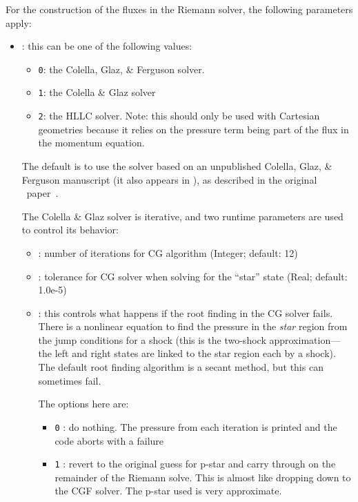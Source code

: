 For the construction of the fluxes in the Riemann solver, the following
parameters apply:
\begin{itemize}
\item {}: this can be one of the following values:
  \begin{itemize}
    \item {\tt 0}: the Colella, Glaz, \& Ferguson solver.  

    \item {\tt 1}: the Colella \& Glaz solver

    \item {\tt 2}: the HLLC solver.  Note: this should only be used with Cartesian
      geometries because it relies on the pressure term being part of the flux
      in the momentum equation.
  \end{itemize}

  The default is to use the solver based on an unpublished Colella,
  Glaz, \& Ferguson manuscript (it also appears in \cite{pember:1996}),
  as described in the original \castro\ paper~\cite{castro_I}.

  The Colella \& Glaz solver is iterative, and two runtime parameters are used
  to control its behavior:
  \begin{itemize}
  \item {}: number of iterations for CG algorithm
    (Integer; default: 12)
    
  \item {}: tolerance for CG solver when solving
     for the ``star'' state (Real; default: 1.0e-5)

  \item {}: this controls what happens if the root
     finding in the CG solver fails.  There is a nonlinear equation to find
     the pressure in the {\em star} region from the jump conditions for a 
     shock (this is the two-shock approximation---the left and right states
     are linked to the star region each by a shock).  The default root 
     finding algorithm is a secant method, but this can sometimes fail.
     
     The options here are:
     \begin{itemize}
     \item {\tt 0} : do nothing.  The pressure from each iteration is
       printed and the code aborts with a failure

     \item {\tt 1} : revert to the original guess for p-star and carry
       through on the remainder of the Riemann solve.  This is almost like
       dropping down to the CGF solver.  The p-star used is very approximate.


\end{itemize}
\end{itemize}
\end{itemize}
